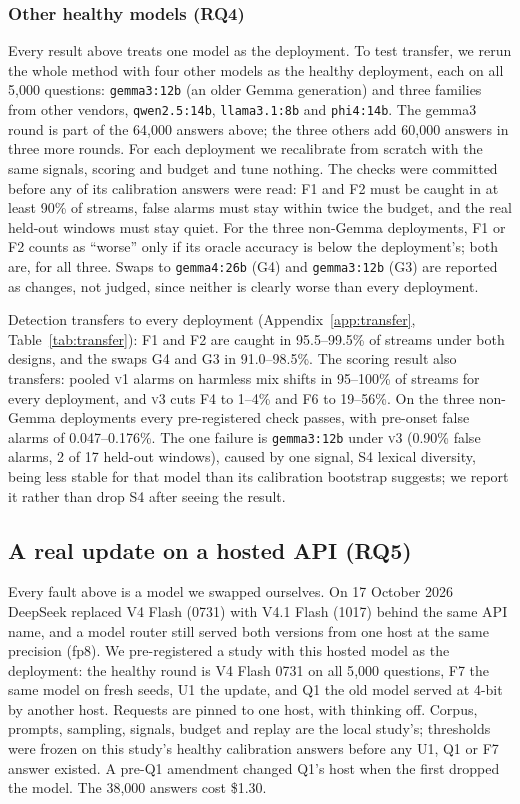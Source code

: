 \documentclass[11pt]{article}
\newcommand{\vone}{\textsc{v1}}
\newcommand{\vthree}{\textsc{v3}}
\begin{document}
\subsubsection{Other healthy models (RQ4)}
\label{sec:transfer}
Every result above treats one model as the deployment. To test transfer, we
rerun the whole method with four other models as the healthy deployment, each on
all 5{,}000 questions: \texttt{gemma3:12b} (an older Gemma generation) and three
families from other vendors, \texttt{qwen2.5:14b}, \texttt{llama3.1:8b} and
\texttt{phi4:14b}. The gemma3 round is part of the 64{,}000 answers above; the
three others add 60{,}000 answers in three more rounds. For each deployment
we recalibrate from scratch with the same signals, scoring and budget and tune
nothing. The checks were committed before any of its calibration answers were
read: F1 and F2 must be caught in at least 90\% of streams, false alarms must stay
within twice the budget, and the real held-out windows must stay quiet. For the
three non-Gemma deployments, F1 or F2 counts as ``worse'' only if its oracle
accuracy is below the deployment's; both are, for all three. Swaps to
\texttt{gemma4:26b} (G4) and \texttt{gemma3:12b} (G3) are reported as changes,
not judged, since neither is clearly worse than every deployment.

Detection transfers to every deployment (Appendix~\ref{app:transfer},
Table~\ref{tab:transfer}): F1 and F2 are caught in 95.5--99.5\% of streams under
both designs, and the swaps G4 and G3 in 91.0--98.5\%. The scoring result also
transfers: pooled \vone{} alarms on harmless mix shifts in 95--100\% of streams for
every deployment, and \vthree{} cuts F4 to 1--4\% and F6 to 19--56\%. On the three
non-Gemma deployments every pre-registered check passes, with pre-onset false alarms
of 0.047--0.176\%. The one failure is \texttt{gemma3:12b} under \vthree{} (0.90\%
false alarms, 2 of 17 held-out windows), caused by one signal, S4 lexical diversity,
being less stable for that model than its calibration bootstrap suggests; we report
it rather than drop S4 after seeing the result.

\subsection{A real update on a hosted API (RQ5)}
\label{app:fixed-api}
Every fault above is a model we swapped ourselves. On 17 October 2026 DeepSeek
replaced V4 Flash (0731) with V4.1 Flash (1017) behind the same API name, and a
model router still served both versions from one host at the same precision
(fp8). We pre-registered a study with this hosted model as the deployment: the
healthy round is V4 Flash 0731 on all 5{,}000 questions, F7 the same model on fresh
seeds, U1 the update, and Q1 the old model served at 4-bit by another host.
Requests are pinned to one host, with thinking off. Corpus, prompts, sampling, signals, budget
and replay are the local study's; thresholds were frozen on this study's healthy
calibration answers before any U1, Q1 or F7 answer existed. A pre-Q1 amendment changed Q1's host when the first dropped the model. The
38{,}000 answers cost \$1.30.
\end{document}
